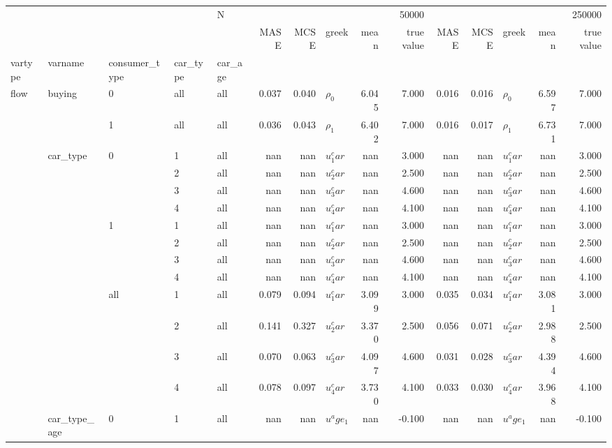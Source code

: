\begin{tabular}{lllllrrlrrrrlrr}
 &  &  &  & N & \multicolumn{5}{r}{50000} & \multicolumn{5}{r}{250000} \\
 &  &  &  &  & MASE & MCSE & greek & mean & true value & MASE & MCSE & greek & mean & true value \\
vartype & varname & consumer_type & car_type & car_age &  &  &  &  &  &  &  &  &  &  \\
\multirow[c]{29}{*}{flow} & \multirow[c]{2}{*}{buying} & 0 & all & all & 0.037 & 0.040 & $\rho_0$ & 6.045 & 7.000 & 0.016 & 0.016 & $\rho_0$ & 6.597 & 7.000 \\
 &  & 1 & all & all & 0.036 & 0.043 & $\rho_1$ & 6.402 & 7.000 & 0.016 & 0.017 & $\rho_1$ & 6.731 & 7.000 \\
 & \multirow[c]{12}{*}{car_type} & \multirow[c]{4}{*}{0} & 1 & all & nan & nan & $u_1^car$ & nan & 3.000 & nan & nan & $u_1^car$ & nan & 3.000 \\
 &  &  & 2 & all & nan & nan & $u_2^car$ & nan & 2.500 & nan & nan & $u_2^car$ & nan & 2.500 \\
 &  &  & 3 & all & nan & nan & $u_3^car$ & nan & 4.600 & nan & nan & $u_3^car$ & nan & 4.600 \\
 &  &  & 4 & all & nan & nan & $u_4^car$ & nan & 4.100 & nan & nan & $u_4^car$ & nan & 4.100 \\
 &  & \multirow[c]{4}{*}{1} & 1 & all & nan & nan & $u_1^car$ & nan & 3.000 & nan & nan & $u_1^car$ & nan & 3.000 \\
 &  &  & 2 & all & nan & nan & $u_2^car$ & nan & 2.500 & nan & nan & $u_2^car$ & nan & 2.500 \\
 &  &  & 3 & all & nan & nan & $u_3^car$ & nan & 4.600 & nan & nan & $u_3^car$ & nan & 4.600 \\
 &  &  & 4 & all & nan & nan & $u_4^car$ & nan & 4.100 & nan & nan & $u_4^car$ & nan & 4.100 \\
 &  & \multirow[c]{4}{*}{all} & 1 & all & 0.079 & 0.094 & $u_1^car$ & 3.099 & 3.000 & 0.035 & 0.034 & $u_1^car$ & 3.081 & 3.000 \\
 &  &  & 2 & all & 0.141 & 0.327 & $u_2^car$ & 3.370 & 2.500 & 0.056 & 0.071 & $u_2^car$ & 2.988 & 2.500 \\
 &  &  & 3 & all & 0.070 & 0.063 & $u_3^car$ & 4.097 & 4.600 & 0.031 & 0.028 & $u_3^car$ & 4.394 & 4.600 \\
 &  &  & 4 & all & 0.078 & 0.097 & $u_4^car$ & 3.730 & 4.100 & 0.033 & 0.030 & $u_4^car$ & 3.968 & 4.100 \\
 & \multirow[c]{12}{*}{car_type_age} & \multirow[c]{4}{*}{0} & 1 & all & nan & nan & $u^age_1$ & nan & -0.100 & nan & nan & $u^age_1$ & nan & -0.100 \\

\end{tabular}
